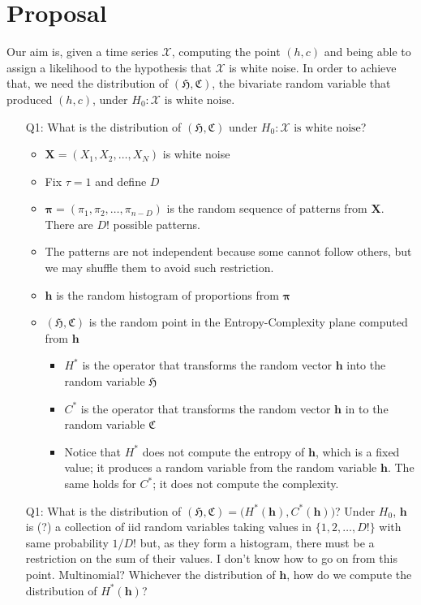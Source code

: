 \documentclass[12pt]{article}
\begin{document}
\section{Proposal}

Our aim is, given a time series $\mathcal X$, computing the point $(h,c)$ and being able to assign a likelihood to the hypothesis that $\mathcal X$ is white noise.
In order to achieve that, we need the distribution of $(\mathfrak{H},\mathfrak{C})$, the bivariate random  variable that produced $(h,c)$, under $H_0:\mathcal X\text { is white noise}$.

\begin{itemize}
\item[Q1:] What is the distribution of $(\mathfrak{H},\mathfrak{C})$ under $H_0:\mathcal X\text { is white noise}$?
\begin{itemize}
	\item $\bm X = (X_1,X_2,\dots,X_N)$ is white noise
	\item Fix $\tau=1$ and define $D$
	\item $\bm \pi=(\pi_1,\pi_2,\dots,\pi_{n-D})$ is the random sequence of patterns from $\bm X$. There are $D!$ possible patterns.
	\item The patterns are not independent because some cannot follow others, but we may shuffle them to avoid such restriction.
	\item $\bm h$ is the random histogram of proportions from $\bm \pi$
	\item $(\mathfrak{H},\mathfrak{C})$ is the random point in the Entropy-Complexity plane computed from $\bm h$
	\begin{itemize}	
		\item $H^*$ is the operator that transforms the random vector $\bm h$ into the random variable $\mathfrak{H}$
		\item $C^*$ is the operator that transforms the random vector $\bm h$ in to the random variable $\mathfrak{C}$
		\item Notice that $H^*$ does not compute the entropy of $\bm h$, which is a fixed value; it produces a random variable from the random variable $\bm h$. The same holds for $C^*$; it does not compute the complexity.
	\end{itemize}
\end{itemize}
\item[Q1:] What is the distribution of $
	(\mathfrak{H},\mathfrak{C}) = 
	\big(H^*(\bm h),C^*(\bm h)\big)$? Under $H_0$, $\bm h$ is (?) a collection of iid random variables taking values in $\{1, 2,\dots, D!\}$ with same probability $1/D!$ but, as they form a histogram, there must be a restriction on the sum of their values. I don't know how to go on from this point. Multinomial? Whichever the distribution of $\bm h$, how do we compute the distribution of $H^*(\bm h)$?

\end{itemize}
\end{document}
